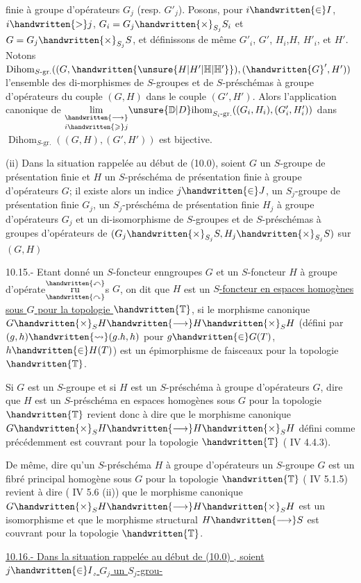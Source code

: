 finie à groupe d'opérateurs $G_j$ (resp. $G'_j$). Posons, pour $i\handwritten{\in}I$, $i\handwritten{>}j$, $G_i=G_j\handwritten{\times}_{S_j}S_i$ et $G=G_j\handwritten{\times}_{S_j}S$, et définissons de même $G'_i$, $G'$, $H_i$,$H$, $H'_i$, et $H'$. Notons $\operatorname{Dihom}_{S\text{-gr.}}((G,\handwritten{\unsure{H|H'|\mathbb{H}|\mathbb{H}'}}),(\handwritten{G}',H'))$ l'ensemble des di-morphismes de $S$-groupes et de $S$-préschémas à groupe d'opérateurs du couple $(G,H)$ dans le couple $(G',H')$. Alors l'application canonique de $\underset{i\handwritten{\geqslant}j}{\underset{\handwritten{\longrightarrow}}{\lim}}{\unsure{\mathbb{D}|D}\mathrm{ihom}}_{S_i\text{-gr.}}((G_i,H_i),(G'_i,H'_i))$ dans $\operatorname{Dihom}_{S\text{-gr.}}((G,H),(G',H'))$ est bijective.

(ii) Dans la situation rappelée au début de (10.0), soient $G$ un $S$-groupe  de présentation finie et $H$ un $S$-préschéma de présentation finie à groupe d'opérateurs $G$; il existe alors un indice $j\handwritten{\in}J$, un $S_j$-groupe de présentation finie $G_j$, un $S_j$-préschéma de présentation finie $H_j$ à groupe d'opérateurs $G_j$ et un di-isomorphisme de $S$-groupes et de $S$-préschémas à groupes d'opérateurs de $(G_j\handwritten{\times}_{S_j}S,H_j\handwritten{\times}_{S_j}S)$ sur$(G,H)$

 10.15.- Etant donné un $S$-foncteur enngroupes $G$ et un $S$-foncteur $H$ à groupe d'opérate$\overset{\handwritten{\curvearrowleft}}{\underset{\handwritten{\curvearrowright}}{\mathrm{ru}}}$s $G$, on dit que $H$ est un \uline{$S$-foncteur en espaces homogènes sous $G$ pour la topologie $\handwritten{\mathbb{T}}$}, si le morphisme canonique $G\handwritten{\times}_S H\handwritten{\longrightarrow}H\handwritten{\times}_S H$ (défini par $(g,h)\handwritten{\rightsquigarrow}(g.h,h)$ pour $g\handwritten{\in}G(T)$, $h\handwritten{\in}H(T)$) est un épimorphisme de faisceaux pour la topologie $\handwritten{\mathbb{T}}$.

Si $G$ est un $S$-groupe et si $H$ est un $S$-préschéma à  groupe d'opérateurs $G$, dire que $H$ est un $S$-préschéma en espaces homogènes sous $G$ pour la topologie $\handwritten{\mathbb{T}}$ revient donc à dire que le morphisme canonique $G\handwritten{\times}_S H\handwritten{\longrightarrow}H\handwritten{\times}_S H$ défini comme précédemment est couvrant pour la topologie $\handwritten{\mathbb{T}}$ ( IV 4.4.3).

De même, dire qu'un $S$-préschéma $H$ à groupe d'opérateurs un $S$-groupe $G$ est un fibré principal homogène sous $G$ pour la topologie $\handwritten{\mathbb{T}}$ ( IV 5.1.5) revient à dire ( IV 5.6 (ii)) que le morphisme canonique $G\handwritten{\times}_S H\handwritten{\longrightarrow}H\handwritten{\times}_S H$ est un isomorphisme et que le morphisme structural $H\handwritten{\longrightarrow}S$ est couvrant pour la topologie $\handwritten{\mathbb{T}}$.

\uline{10.16.- Dans la situation rappelée au début de (10.0) , soient $j\handwritten{\in}I$, $G_j$ un $S_j$-grou-}
